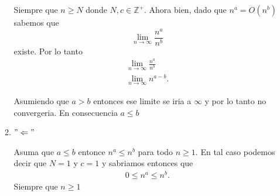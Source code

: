 \documentclass[12pt]{exam}
\begin{document}
\begin{enumerate}
\begin{enumerate}
      Siempre que $n\ge N$ donde $N,c \in \mathbb{Z}^{+}$. Ahora bien, dado que $n^{a}=O\left( n^{b} \right) $ sabemos que 
      \begin{equation*}
      \displaystyle \lim_{n\to \infty}\frac{n^{a}}{n^{b}}
    \end{equation*}
       existe. Por lo tanto
      \begin{align*}
        \lim_{n \to \infty} \frac{n^{a}}{n^{b}}\\
	\lim_{n \to \infty} n^{a-b}
      .\end{align*}

      Asumiendo que $a>b$ entonces ese limite se iria a $\infty$ y por lo tanto no convergeria. En consecuencia $a\le b$
      
    \item $"\Leftarrow"$
      
      Asuma que $a\le b$ entonce $n^{a}\le n^{b}$ para todo $n\ge 1$. En tal caso podemos decir que $N=1$ y $c=1$ y sabriamos entonces que
      \begin{align*}
        0\le n^{a} \le n^{b}
      .\end{align*} Siempre que $n\ge 1$
  \end{enumerate}
\end{enumerate}
\end{document}
